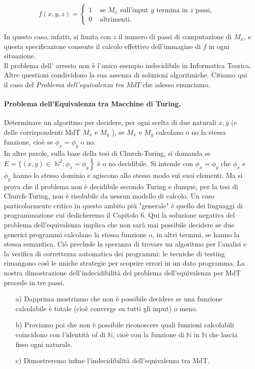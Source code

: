 \[
    f(x, y, z)= \begin{cases}1 & \text { se } M_x \text { sull'input } y \text { termina in } z \text { passi, } \\ 0 & \text { altrimenti. }\end{cases}
\]

In questo caso, infatti, si limita con $z$ il numero di passi di computazione di
$M_x$, e questa specificazione consente il calcolo effettivo dell'immagine di
$f$ in ogni situazione.\\ Il problema dell' arresto non è l'unico esempio
indecidibile in Informatica Teorica. Altre questioni condividono la sua assenza
di soluzioni algoritmiche. Citiamo qui il caso del \textit{Problema dell'equivalenza tra
    $MdT$} che adesso enunciamo.

\paragraph{Problema dell'Equivalenza tra Macchine di Turing.} Determinare un algoritmo per
decidere, per ogni scelta di due naturali $x, y$ (e delle corrispondenti MdT
$M_x$ e $M_y$ ), se $M_x$ e $M_y$ calcolano o no la stessa funzione, cioè se
$\phi_x=\phi_y$ o no.\\

In altre parole, sulla base della tesi di Church-Turing,
si domanda se $E=\{(x, y) \in$ $\left.\mathbb{N}^2: \phi_x=\phi_y\right\}$ è o
no decidibile. Si intende con $\phi_x=\phi_y$ che $\phi_x$ e $\phi_y$ hanno lo
stesso dominio e agiscono allo stesso modo sui suoi elementi. Ma si prova che il
problema non è decidibile secondo Turing e dunque, per la tesi di Church-Turing,
non è risolubile da nessun modello di calcolo. Un caso particolarmente critico
in questo ambito più "generale" è quello dei linguaggi di programmazione cui
dedicheremo il Capitolo 6. Qui la soluzione negativa del problema
dell'equivalenza implica che non sarà mai possibile decidere se due generici
programmi calcolano la stessa funzione o, in altri termini, se hanno la stessa
semantica. Ciò preclude la speranza di trovare un algoritmo per l'analisi e la
verifica di correttezza automatica dei programmi: le tecniche di testing
rimangono così le uniche strategie per scoprire errori in un dato programma. La
nostra dimostrazione dell'indecidibilità del problema dell'equivalenza per MdT
procede in tre passi.

\begin{itemize}
    \item[a)] Dapprima mostriamo che non è possibile decidere se una funzione
        calcolabile è totale (cioè converge su tutti gli input) o meno.
    \item[b)] Proviamo poi che non è possibile riconoscere quali funzioni
        calcolabili coincidono con l'identità $i d$ di $\mathbb{N}$, cioè con
        la funzione di $\mathbb{N}$ in $\mathbb{N}$ che lascia fisso ogni
        naturale.
    \item[c)] Dimostreremo infine l'indecidibilità dell'equivalenza tra MdT.
\end{itemize}

